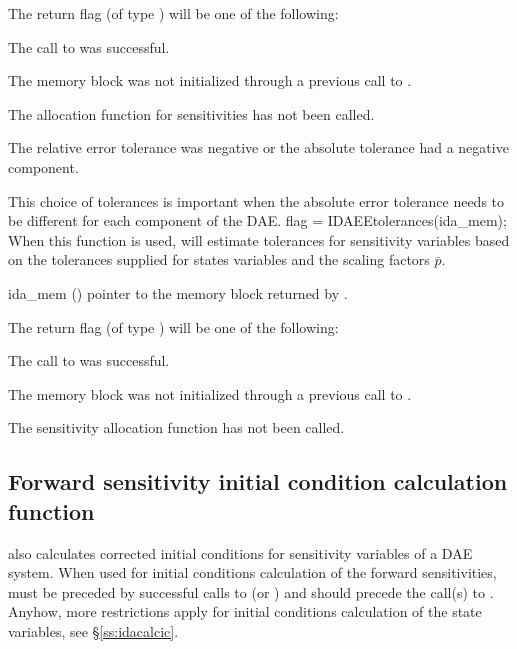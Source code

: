 {
  The return flag  (of type ) will be one of the following:
  \begin{args}
  \item[\Id{IDA\_SUCCESS}]
    The call to  was successful.
  \item[\Id{IDA\_MEM\_NULL}] 
    The {\idas} memory block was not initialized through a previous call to
    .
  \item[\Id{IDA\_NO\_SENS}] 
    The allocation function for sensitivities  has not been called.
  \item[\Id{IDA\_ILL\_INPUT}] 
    The relative error tolerance was negative or the absolute tolerance
    had a negative component.
  \end{args}
}
{
  This choice of tolerances is important when the absolute error tolerance needs to
  be different for each component of the DAE. 
}
{
  flag = IDAEEtolerances(ida\_mem);
}
{
  When this function is used, {\idas} will estimate tolerances for sensitivity variables based on the 
  tolerances supplied for states variables and the scaling factors $\bar p$.
}
{
  \begin{args}
  \item[ida\_mem] ()
    pointer to the {\idas} memory block returned by .
  \end{args}
}
{
  The return flag  (of type ) will be one of the following:
  \begin{args}
  \item[\Id{IDA\_SUCCESS}]
    The call to  was successful.
  \item[\Id{IDA\_MEM\_NULL}] 
    The {\idas} memory block was not initialized through a previous call to
    .
  \item[\Id{IDA\_NO\_SENS}] 
    The sensitivity allocation function  has not been called.
  \end{args}
}
{}


\subsection{Forward sensitivity initial condition calculation function}
\label{sss:idasenscalcic}

 also calculates corrected initial conditions for sensitivity
variables of a DAE system. When used for initial conditions calculation of the 
forward sensitivities,  must be preceded by successful calls to  
 (or ) and should precede the call(s) to 
. Anyhow, more restrictions apply for initial conditions
calculation of the state variables, see \S\ref{ss:idacalcic}.

